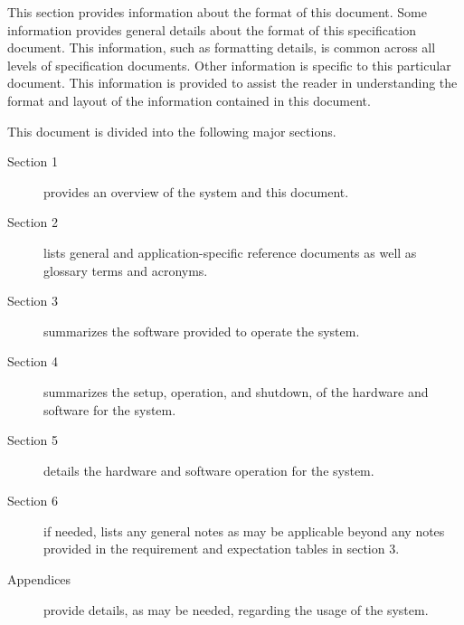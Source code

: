This section provides information about the format of this document.
Some information provides general details about the format of this specification document.
This information, such as formatting details, is common across all levels of specification documents.
Other information is specific to this particular document.
This information is provided to assist the reader in understanding the format and layout of the information contained in this document.

This document is divided into the following major sections.
\begin{description}
	\item[Section 1] provides an overview of the system and this document.
	\item[Section 2] lists general and application-specific reference documents as well as glossary terms and acronyms. 
	\item[Section 3] summarizes the software provided to operate the system.
	\item[Section 4] summarizes the setup, operation, and shutdown, of the hardware and software for the system.
	\item[Section 5] details the hardware and software operation for the system.
	\item[Section 6] if needed, lists any general notes as may be applicable beyond any notes provided in the requirement and expectation tables in section 3.
	\item[Appendices] provide details, as may be needed, regarding the usage of the system.
\end{description}